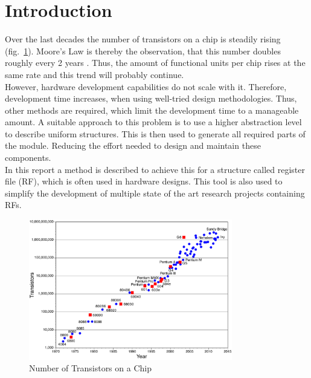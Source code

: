 \section{Introduction}
Over the last decades the number of transistors on a chip is steadily rising (fig.~\ref{fig::moore}). Moore's Law is thereby the observation, that this number doubles roughly every 2 years \cite{moores_law}. Thus, the amount of functional units per chip rises at the same rate and this trend will probably continue.\\
However, hardware development capabilities do not scale with it. Therefore, development time increases, when using well-tried design methodologies. Thus, other methods are required, which limit the development time to a manageable amount. A suitable approach to this problem is to use a higher abstraction level to describe uniform structures. This is then used to generate all required parts of the module. Reducing the effort needed to design and maintain these components.\\
In this report a method is described to achieve this for a structure called register file (RF), which is often used in hardware designs. This tool is also used to simplify the development of multiple state of the art research projects containing RFs.
\begin{figure}[h]
 \centering
 \includegraphics[width=252pt]{images/mooreslawcurve.png}
 \caption{Number of Transistors on a Chip \cite{moore}}
\label{fig::moore}
\end{figure}
